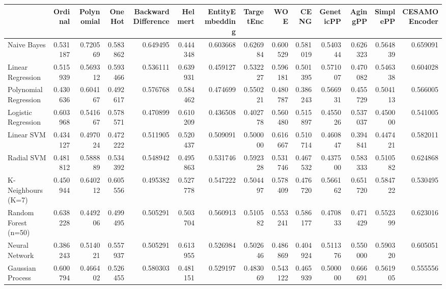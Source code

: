 \begin{tabular}{lrrrrrrrrrrrrr}
\toprule
{} &   Ordinal &  Polynomial &    OneHot &  BackwardDifference &   Helmert &  EntityEmbedding &  TargetEnc &       WOE &      CENG &  GeneticPP &   AgingPP &  SimplePP &  CESAMOEncoder \\
\midrule
Naive Bayes           &  0.531187 &    0.720569 &  0.583862 &            0.649495 &  0.444348 &         0.603668 &   0.626984 &  0.600529 &  0.581019 &   0.540344 &  0.626323 &  0.564839 &       0.659091 \\
Linear Regression     &  0.515939 &    0.569312 &  0.593466 &            0.536111 &  0.639931 &         0.459127 &   0.532227 &  0.596181 &  0.501395 &   0.571007 &  0.470082 &  0.546338 &       0.604028 \\
Polynomial Regression &  0.430636 &    0.604167 &  0.492617 &            0.576768 &  0.584462 &         0.474699 &   0.550221 &  0.480787 &  0.386243 &   0.566931 &  0.455729 &  0.504113 &       0.566005 \\
Logistic Regression   &  0.603968 &    0.541667 &  0.578571 &            0.470899 &  0.610209 &         0.436508 &   0.402778 &  0.560480 &  0.515897 &   0.455026 &  0.537037 &  0.450000 &       0.541005 \\
Linear SVM            &  0.434127 &    0.497024 &  0.472222 &            0.511905 &  0.520437 &         0.509091 &   0.500000 &  0.616667 &  0.510714 &   0.460847 &  0.394841 &  0.447421 &       0.582011 \\
Radial SVM            &  0.481812 &    0.588889 &  0.534392 &            0.548942 &  0.495863 &         0.531746 &   0.592328 &  0.531746 &  0.467532 &   0.437500 &  0.583333 &  0.510582 &       0.624868 \\
K-Neighbours (K=7)    &  0.450944 &    0.640212 &  0.605556 &            0.495382 &  0.527778 &         0.547222 &   0.504497 &  0.578409 &  0.476720 &   0.566162 &  0.651720 &  0.584722 &       0.530495 \\
Random Forest (n=50)  &  0.638228 &    0.449206 &  0.499495 &            0.505291 &  0.503704 &         0.560913 &   0.510582 &  0.553241 &  0.586177 &   0.470833 &  0.471429 &  0.552399 &       0.623016 \\
Neural Network        &  0.386243 &    0.514021 &  0.557937 &            0.505291 &  0.613955 &         0.526984 &   0.502646 &  0.486869 &  0.404924 &   0.511376 &  0.550000 &  0.590320 &       0.605051 \\
Gaussian Process      &  0.600794 &    0.466402 &  0.526455 &            0.580303 &  0.481151 &         0.529197 &   0.483069 &  0.543122 &  0.465939 &   0.500000 &  0.666691 &  0.561905 &       0.555556 \\
\bottomrule
\end{tabular}
